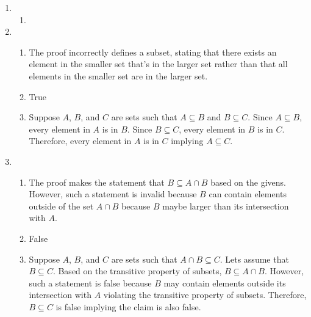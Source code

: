 \begin{enumerate}
    \item
          \begin{enumerate}[label=(\alph*), itemsep=3pt]
              \item
          \end{enumerate}

    \item
          \begin{enumerate}[label=(\alph*), itemsep=3pt]
              \item The proof incorrectly defines a subset, stating that there exists an element in the smaller set that's in the larger set rather than that all elements in the smaller set are in the larger set.
              \item True
              \item Suppose $A$, $B$, and $C$ are sets such that $A \subseteq B$ and $B \subseteq C$. Since $A \subseteq B$, every element in $A$ is in $B$. Since $B \subseteq C$, every element in $B$ is in $C$. Therefore, every element in $A$ is in $C$ implying $A \subseteq C$.
          \end{enumerate}

    \item
          \begin{enumerate}[label=(\alph*), itemsep=3pt]
              \item The proof makes the statement that $B \subseteq A \cap B$ based on the givens. However, such a statement is invalid because $B$ can contain elements outside of the set $A \cap B$ because $B$ maybe larger than its intersection with $A$.
              \item False
              \item Suppose $A$, $B$, and $C$ are sets such that $A \cap B \subseteq C$. Lets assume that $B \subseteq C$. Based on the transitive property of subsets, $B \subseteq A \cap B$. However, such a statement is false because $B$ may contain elements outside its intersection with $A$ violating the transitive property of subsets. Therefore, $B \subseteq C$ is false implying the claim is also false.
          \end{enumerate}
\end{enumerate}